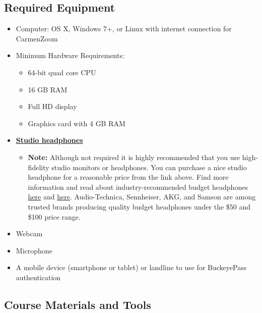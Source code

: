 \subsection{Required Equipment}

\begin{itemize}
      \tightlist
      \item Computer: OS X, Windows 7+, or Linux with internet connection for CarmenZoom
      \item Minimum Hardware Requirements:
            \begin{itemize}
                  \item 64-bit quad core CPU
                  \item 16 GB RAM
                  \item Full HD display
                  \item Graphics card with 4 GB RAM
            \end{itemize}
      \item \href{https://amzn.to/2XyXzc9}{\textbf{Studio headphones}}
            \begin{itemize}
                  \item \textbf{Note:} Although not required it is highly recommended that you use high-fidelity studio monitors or headphones. You can purchase a nice studio headphone for a reasonable price from the link above. Find more information and read about industry-recommended budget headphones \href{https://www.gearank.com/guides/cheap-studio-headphones}{here} and \href{https://www.musicradar.com/news/best-budget-studio-headphones}{here}. Audio-Technica, Sennheiser, AKG, and Samson are among trusted brands producing quality budget headphones under the \$50 and \$100 price range.
            \end{itemize}
      \item Webcam
      \item Microphone
      \item A mobile device (smartphone or tablet) or landline to use for BuckeyePass authentication
\end{itemize}

\subsection{Course Materials and Tools}

